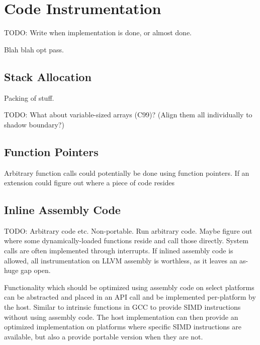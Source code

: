 \chapter {Code Instrumentation}

TODO: Write when implementation is done, or almost done.

Blah blah opt pass.

\section {Stack Allocation}

Packing of stuff.

TODO: What about variable-sized arrays (C99)? (Align them all individually to
shadow boundary?)


\section {Function Pointers}

Arbitrary function calls could potentially be done using function pointers.
If an extension could figure out where a piece of code resides


\section {Inline Assembly Code}

TODO: Arbitrary code etc. Non-portable. Run arbitrary code. Maybe figure out
where some dynamically-loaded functions reside and call those directly. System
calls are often implemented through interrupts. If inlined assembly code is
allowed, all instrumentation on LLVM assembly is worthless, as it leaves an
as-huge gap open.

Functionality which should be optimized using assembly code on select platforms
can be abstracted and placed in an API call and be implemented per-platform by
the host. Similar to intrinsic functions in GCC to provide SIMD instructions
without using assembly code. The host implementation can then provide an
optimized implementation on platforms where specific SIMD instructions are
available, but also a provide portable version when they are not.
